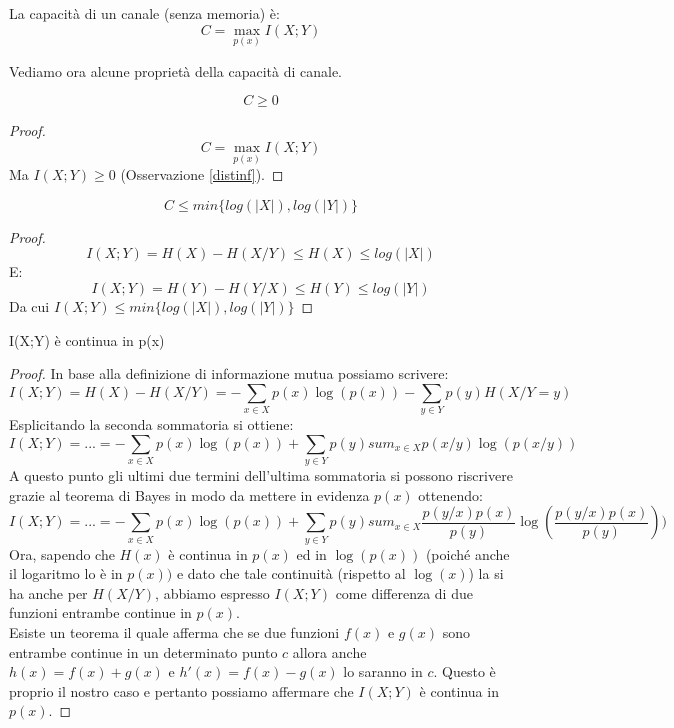 \begin{definizione}
 La capacità di un canale (senza memoria) è:
 \[
  C=\max_{p(x)} I(X;Y)
 \]

\end{definizione}

\bigskip

\noindent
Vediamo ora alcune proprietà della capacità di canale.

\begin{osservazione}
\[
 C \ge 0
\]
 \begin{proof}
  \[
   C=\max_{p(x)} I(X;Y)
  \]
  Ma $I(X;Y) \ge 0$ (Osservazione \ref{distinf}).
 \end{proof}
\end{osservazione}

\bigskip

\begin{osservazione}
\[
 C \le min\{log(|X|), log(|Y|)\}
\]
 \begin{proof}
  \[
   I(X;Y)=H(X)-H(X/Y) \le H(X) \le log(|X|)
  \]
  E:
  \[
   I(X;Y)=H(Y)-H(Y/X) \le H(Y) \le log(|Y|)
  \]
  Da cui $I(X;Y) \le min\{log(|X|), log(|Y|)\}$
 \end{proof}
\end{osservazione}

\bigskip

\begin{osservazione}
\mbox{}

 I(X;Y) è continua in p(x)
 \begin{proof}
 In base alla definizione di informazione mutua possiamo scrivere:
 \[
  I(X;Y) = H(X) - H(X/Y) = - \sum_{x \in X} p(x) \log(p(x)) - \sum_{y \in Y} p(y) H(X/Y = y)
 \]
 Esplicitando la seconda sommatoria si ottiene:
 \[
 I(X;Y) = ... = - \sum_{x \in X} p(x) \log(p(x)) + \sum_{y \in Y} p(y) sum_{x \in X} p(x/y) \log(p(x/y))
 \]
 A questo punto gli ultimi due termini dell'ultima sommatoria si possono riscrivere grazie al teorema di Bayes in modo da mettere in evidenza $p(x)$ ottenendo:
 \[
 I(X;Y) = ... = - \sum_{x \in X} p(x) \log(p(x)) + \sum_{y \in Y} p(y) sum_{x \in X} \dfrac{p(y/x) p(x)}{p(y)} \log(\dfrac{p(y/x) p(x)}{p(y)}))
 \]
 Ora, sapendo che $H(x)$ è continua in $p(x)$ ed in $\log(p(x))$ (poiché anche il logaritmo lo è in $p(x))$ e dato che tale continuità (rispetto al $\log(x)$) la si ha anche per $H(X/Y)$, abbiamo espresso $I(X; Y)$ come differenza 
 di due funzioni entrambe continue in $p(x)$.\\
 Esiste un teorema il quale afferma che se due funzioni $f(x)$ e $g(x)$ sono entrambe continue in un determinato punto $c$ allora anche $h(x) = f(x) + g(x)$ e $h'(x) = f(x) - g(x)$ lo saranno in $c$. Questo è proprio il nostro caso 
 e pertanto possiamo affermare che $I(X;Y)$ è continua in $p(x)$.
 \end{proof}
\end{osservazione}

